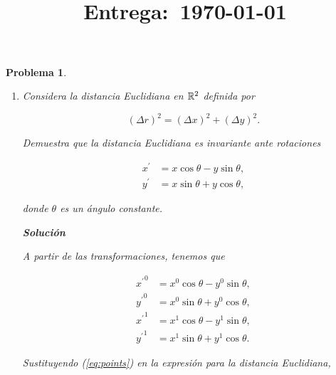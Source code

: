\documentclass[12pt]{article}
\title{
    \textbf{\homeworknumber}\\
    \normalsize\vspace{0.1in}\small{\textbf{Entrega}:~\today}
    \vspace{-1.5in}
}
\author{}
\date{}
\theoremstyle{break}
\newtheorem{exercise}{Problema}
\theoremstyle{nonumberbreak}
\newcommand*{\inlinesol}{\vspace*{10pt}\textbf{Solución}\vspace*{10pt}}
\begin{document}
    \maketitle
    \thispagestyle{fancy}
    
    \begin{exercise}
        \begin{enumerate}[label = \alph*)]
            \item Considera la distancia Euclidiana en \(\vecspace{R}[2]\) definida por
            
                \begin{equation*}
                    (\Delta r)^{2} = (\Delta x)^{2} + (\Delta y)^{2}.
                \end{equation*}

                Demuestra que la distancia Euclidiana es invariante ante rotaciones

                \begin{align*}
                    x^{\prime} &= x\cos\theta - y\sin\theta,\\
                    y^{\prime} &= x\sin\theta + y\cos\theta,
                \end{align*}

                donde \(\theta\) es un ángulo constante.

            \inlinesol

            A partir de las transformaciones, tenemos que 

            \begin{equation}
                \begin{aligned}
                    {x^{\prime}}^{0} &= x^{0}\cos\theta - y^{0}\sin\theta,\\
                    {y^{\prime}}^{0} &= x^{0}\sin\theta + y^{0}\cos\theta,\\
                    {x^{\prime}}^{1} &= x^{1}\cos\theta - y^{1}\sin\theta,\\
                    {y^{\prime}}^{1} &= x^{1}\sin\theta + y^{1}\cos\theta.
                \end{aligned}
                \label{eq:points}
            \end{equation}

            Sustituyendo (\ref{eq:points}) en la expresión para la distancia Euclidiana,


\end{enumerate}
\end{exercise}
\end{document}
